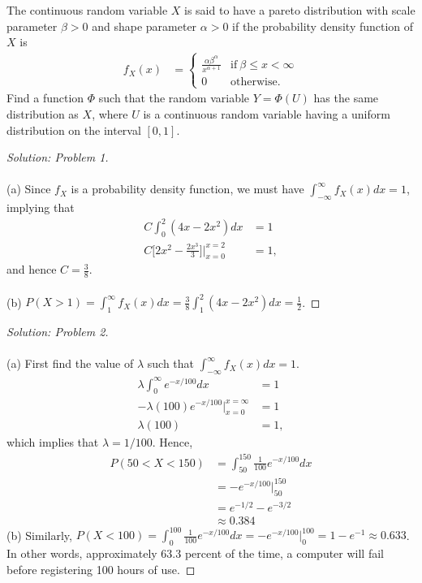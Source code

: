 \documentclass[10pt]{article}
\newenvironment{problem}[2][Problem]{\begin{trivlist}
\item[\hskip \labelsep {\bfseries #1}\hskip \labelsep {\bfseries #2.}]}{\end{trivlist}}
\begin{document}
\begin{problem}{10}
The continuous random variable $X$ is said to have a pareto distribution with scale parameter $\beta > 0$ and shape parameter $\alpha > 0$ if the probability density function of $X$ is
\begin{align*}
    f_X(x) &= 
    \begin{cases}
      \frac{\alpha \beta^\alpha}{x^{\alpha+1}} & \text{if}\ \beta \leq x < \infty \\
      0 & \text{otherwise.}
    \end{cases}
\end{align*}
Find a function $\Phi$ such that the random variable $Y = \Phi(U)$ has the same distribution as $X$, where $U$ is a continuous random variable having a uniform distribution on the interval $[0,1]$.
\end{problem}


\newpage

\begin{proof}[Solution: Problem 1]
\text{}\\
\text{}\\
(a) Since $f_X$ is a probability density function, we must have $\int_{-\infty}^\infty f_X(x) dx = 1$, implying that
\begin{align*}
C \int_0^2 (4x-2x^2) dx &= 1\\
C\bigg[2x^2 -\frac{2x^3}{3}\bigg]\bigg|^{x=2}_{x=0} &=  1,
\end{align*}
and hence $C =  \frac{3}{8}$.\\
\text{}\\
(b) $P(X > 1) = \int_1^\infty f_X(x) dx  = \frac{3}{8} \int_1^2 (4x-2x^2) dx = \frac{1}{2}$.
\end{proof}

\vspace{0.2cm}
\begin{proof}[Solution: Problem 2]
\text{}\\
\text{}\\
(a) First find the value of $\lambda$ such that $\int_{-\infty}^\infty f_X(x) dx = 1$.
\begin{align*}
\lambda \int_0^\infty e^{-x/100}dx &=  1\\
-\lambda(100)e^{-x/100} \bigg|^{x=\infty}_{x=0}  &=  1\\
\lambda(100)  &=  1,
\end{align*}
which implies that $\lambda = 1/100$. Hence, 
\begin{align*}
P(50 < X < 150) &= \int_{50}^{150} \frac{1}{100}e^{-x/100}dx\\
&=-e^{-x/100}\bigg|_{50}^{150}\\
&=e^{-1/2} - e^{-3/2}\\
&\approx 0.384
\end{align*}
(b) Similarly, $P(X < 100) = \int_{0}^{100} \frac{1}{100}e^{-x/100}dx = -e^{-x/100}\bigg|_{0}^{100} =1 -e^{-1} \approx 0.633$. In other words, approximately 63.3 percent of the time, a computer will fail before registering 100 hours of use.
\end{proof}
\end{document}
